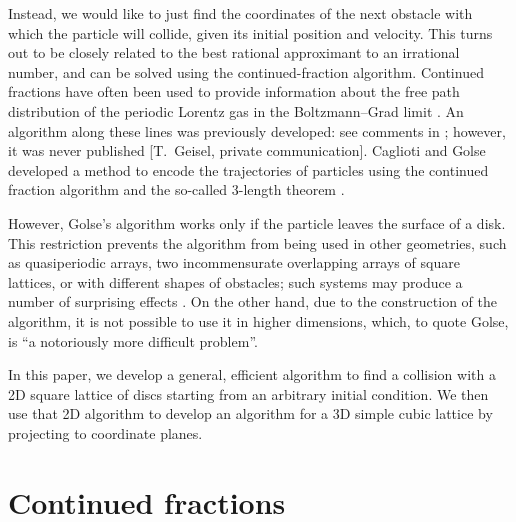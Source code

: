 \documentclass{iopart}
\begin{document}
Instead, we would like to just find the coordinates of the next obstacle with which the particle will collide, given its initial position and velocity.
%
%
This turns out to be  closely related to the best rational approximant to an irrational number, and  can be solved using the continued-fraction algorithm. 
 Continued fractions have often been used to provide information about the free path distribution of the periodic Lorentz gas in the Boltzmann--Grad limit \cite{caglioti2003distribution, golse2012recent,boca2007distribution,golse2006periodic,caglioti2008boltzmann, caglioti2010boltzmann, golse2000distribution, bleher1992statistical,chernov1994statistical}.
  An algorithm along these lines was previously developed: see comments in \cite{zacherl1986power}; however, it was never published %
[T.~Geisel, private communication].
 Caglioti and Golse developed a method to encode the trajectories of particles using the continued fraction algorithm and the so-called 3-length theorem \cite{caglioti2003distribution, golse2012recent}. 


However, Golse's algorithm works only if the particle leaves the surface of a disk. This restriction prevents the algorithm from being used in other geometries, such as quasiperiodic arrays, two incommensurate overlapping arrays of square lattices, or with different shapes of obstacles; such systems may produce a number of surprising effects \cite{marklof2014power}.  On the other hand, due to the construction of the algorithm, it is not possible to use it in higher dimensions, which, to quote Golse, is ``a notoriously more difficult problem''.

In this paper, we develop a general, efficient algorithm to find a collision with a 2D square lattice of discs starting from an arbitrary initial condition. We then use that 2D algorithm to develop an algorithm for a 3D simple cubic lattice by projecting to coordinate planes.

\section{Continued fractions}
\label{algorithm}
\end{document}
